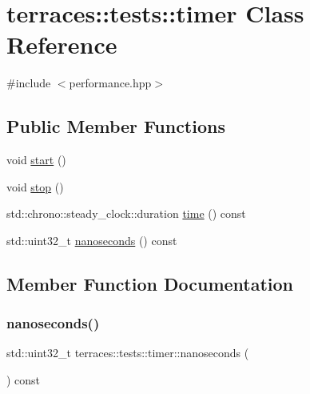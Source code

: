 \hypertarget{classterraces_1_1tests_1_1timer}{}\section{terraces\+:\+:tests\+:\+:timer Class Reference}
\label{classterraces_1_1tests_1_1timer}


{\ttfamily \#include $<$performance.\+hpp$>$}

\subsection*{Public Member Functions}
\begin{DoxyCompactItemize}
\item 
void \hyperlink{classterraces_1_1tests_1_1timer_a43b0d8af26380d68962b4d583d98a2e7}{start} ()
\item 
void \hyperlink{classterraces_1_1tests_1_1timer_a239a44259df8bc77499fe8431f9f4825}{stop} ()
\item 
std\+::chrono\+::steady\+\_\+clock\+::duration \hyperlink{classterraces_1_1tests_1_1timer_ab3c8672bcc529d9e28fe005474e9603c}{time} () const
\item 
std\+::uint32\+\_\+t \hyperlink{classterraces_1_1tests_1_1timer_a98255ef486715a3a31847e65284b9527}{nanoseconds} () const
\end{DoxyCompactItemize}


\subsection{Member Function Documentation}
\mbox{\label{classterraces_1_1tests_1_1timer_a98255ef486715a3a31847e65284b9527}} 
\subsubsection{\texorpdfstring{nanoseconds()}{nanoseconds()}}
{\footnotesize\ttfamily std\+::uint32\+\_\+t terraces\+::tests\+::timer\+::nanoseconds (\begin{DoxyParamCaption}{ }\end{DoxyParamCaption}) const\hspace{0.3cm}{\ttfamily [inline]}}

